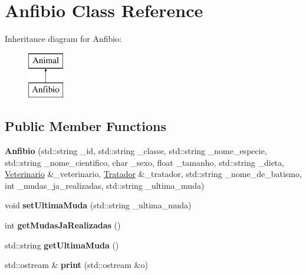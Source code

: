 \hypertarget{classAnfibio}{}\section{Anfibio Class Reference}
\label{classAnfibio}
Inheritance diagram for Anfibio\+:\begin{figure}[H]
\begin{center}
\leavevmode
\includegraphics[height=2.000000cm]{classAnfibio}
\end{center}
\end{figure}
\subsection*{Public Member Functions}
\begin{DoxyCompactItemize}
\item 
\mbox{\label{classAnfibio_aebbf81fc5e9f86b2e42bcdfe52ab7514}} 
{\bfseries Anfibio} (std\+::string \+\_\+id, std\+::string \+\_\+classe, std\+::string \+\_\+nome\+\_\+especie, std\+::string \+\_\+nome\+\_\+cientifico, char \+\_\+sexo, float \+\_\+tamanho, std\+::string \+\_\+dieta, \hyperlink{classVeterinario}{Veterinario} \&\+\_\+veterinario, \hyperlink{classTratador}{Tratador} \&\+\_\+tratador, std\+::string \+\_\+nome\+\_\+de\+\_\+batismo, int \+\_\+mudas\+\_\+ja\+\_\+realizadas, std\+::string \+\_\+ultima\+\_\+muda)
\item 
\mbox{\label{classAnfibio_a3c18155735838879de283120c1ccf4a4}} 
void {\bfseries set\+Ultima\+Muda} (std\+::string \+\_\+ultima\+\_\+muda)
\item 
\mbox{\label{classAnfibio_a7dbb38f199ce548803f9f688a4041d5e}} 
int {\bfseries get\+Mudas\+Ja\+Realizadas} ()
\item 
\mbox{\label{classAnfibio_a8ae043bc3b2cd178817eb4d97a6da5aa}} 
std\+::string {\bfseries get\+Ultima\+Muda} ()
\item 
\mbox{\label{classAnfibio_a0e38cc3c4c3cad0233d118d46775a1b6}} 
std\+::ostream \& {\bfseries print} (std\+::ostream \&o)
\end{DoxyCompactItemize}
